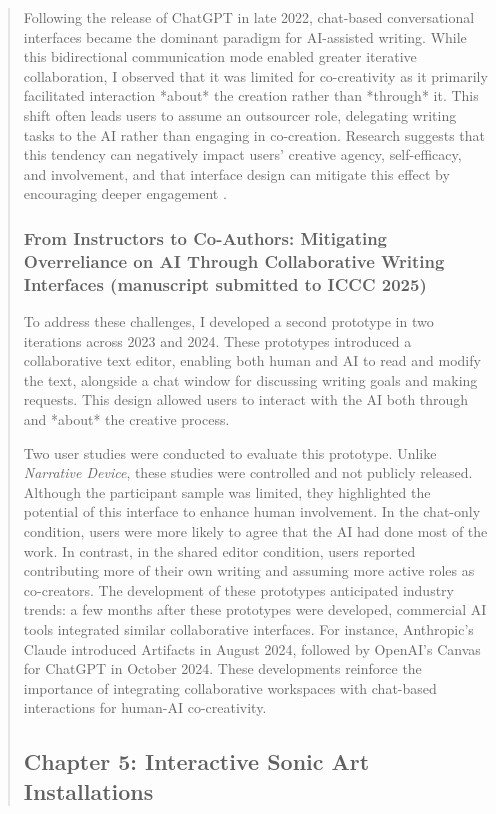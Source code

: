\begin{quote}
Following the release of ChatGPT in late 2022, chat-based conversational interfaces became the dominant paradigm for AI-assisted writing. While this bidirectional communication mode enabled greater iterative collaboration, I observed that it was limited for co-creativity as it primarily facilitated interaction *about* the creation rather than *through* it. This shift often leads users to assume an outsourcer role, delegating writing tasks to the AI rather than engaging in co-creation. Research suggests that this tendency can negatively impact users’ creative agency, self-efficacy, and involvement, and that interface design can mitigate this effect by encouraging deeper engagement \cite{Kantosalo2016-hg, McGuire2024-im}.

\subsubsection{From Instructors to Co-Authors: Mitigating Overreliance on AI Through Collaborative Writing Interfaces (manuscript submitted to ICCC 2025)} To address these challenges, I developed a second prototype in two iterations across 2023 and 2024. These prototypes introduced a collaborative text editor, enabling both human and AI to read and modify the text, alongside a chat window for discussing writing goals and making requests. This design allowed users to interact with the AI both through and *about* the creative process. 

Two user studies were conducted to evaluate this prototype. Unlike \textit{Narrative Device}, these studies were controlled and not publicly released. Although the participant sample was limited, they highlighted the potential of this interface to enhance human involvement. In the chat-only condition, users were more likely to agree that the AI had done most of the work. In contrast, in the shared editor condition, users reported contributing more of their own writing and assuming more active roles as co-creators. The development of these prototypes anticipated industry trends: a few months after these prototypes were developed, commercial AI tools integrated similar collaborative interfaces. For instance, Anthropic’s Claude introduced Artifacts in August 2024, followed by OpenAI’s Canvas for ChatGPT in October 2024. These developments reinforce the importance of integrating collaborative workspaces with chat-based interactions for human-AI co-creativity.

\subsection{Chapter 5: Interactive Sonic Art Installations}


\end{quote}
